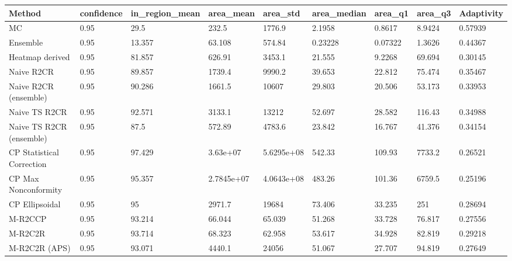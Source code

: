 \begin{tabular}{lllllllll}
\toprule
Method & confidence & in_region_mean & area_mean & area_std & area_median & area_q1 & area_q3 & Adaptivity \\
\midrule
MC & 0.95 & 29.5 & 232.5 & 1776.9 & 2.1958 & 0.8617 & 8.9424 & 0.57939 \\
Ensemble & 0.95 & 13.357 & 63.108 & 574.84 & 0.23228 & 0.07322 & 1.3626 & 0.44367 \\
Heatmap derived & 0.95 & 81.857 & 626.91 & 3453.1 & 21.555 & 9.2268 & 69.694 & 0.30145 \\
Naive R2CR & 0.95 & 89.857 & 1739.4 & 9990.2 & 39.653 & 22.812 & 75.474 & 0.35467 \\
Naive R2CR (ensemble) & 0.95 & 90.286 & 1661.5 & 10607 & 29.803 & 20.506 & 53.173 & 0.33953 \\
Naive TS R2CR & 0.95 & 92.571 & 3133.1 & 13212 & 52.697 & 28.582 & 116.43 & 0.34988 \\
Naive TS R2CR (ensemble) & 0.95 & 87.5 & 572.89 & 4783.6 & 23.842 & 16.767 & 41.376 & 0.34154 \\
CP Statistical Correction & 0.95 & 97.429 & 3.63e+07 & 5.6295e+08 & 542.33 & 109.93 & 7733.2 & 0.26521 \\
CP Max Nonconformity & 0.95 & 95.357 & 2.7845e+07 & 4.0643e+08 & 483.26 & 101.36 & 6759.5 & 0.25196 \\
CP Ellipsoidal & 0.95 & 95 & 2971.7 & 19684 & 73.406 & 33.235 & 251 & 0.28694 \\
M-R2CCP & 0.95 & 93.214 & 66.044 & 65.039 & 51.268 & 33.728 & 76.817 & 0.27556 \\
M-R2C2R & 0.95 & 93.714 & 68.323 & 62.958 & 53.617 & 34.928 & 82.819 & 0.29218 \\
M-R2C2R (APS) & 0.95 & 93.071 & 4440.1 & 24056 & 51.067 & 27.707 & 94.819 & 0.27649 \\
\bottomrule
\end{tabular}
